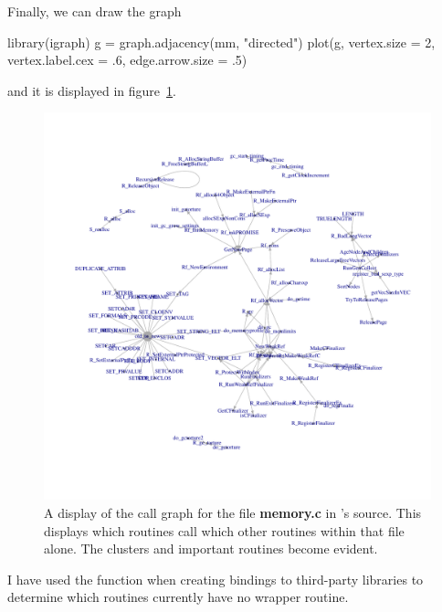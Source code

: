 \documentclass[article]{jss}
\def\R{\proglang{R}}
\def\Rpkg#1{\pkg{#1}}
\def\file#1{\textbf{#1}}
\begin{document}
Finally, we can draw the graph
\begin{RCode}
library(igraph)
g = graph.adjacency(mm, "directed")       
plot(g, vertex.size = 2, vertex.label.cex = .6, edge.arrow.size = .5)
\end{RCode}
and it is displayed in figure~\ref{fig:callgraph}.

\begin{figure}
\includegraphics[width=\textwidth,height=.9\textheight]{callgraph.pdf}
\caption{A display of the call graph for the file \file{memory.c} in
  \R's source. This displays which routines call which other routines
  within that file alone. The clusters and important routines become evident.}
  \label{fig:callgraph}
\end{figure}

I have used the \Rpkg{findCalls} function when creating bindings to
third-party libraries to determine which routines currently have no
wrapper routine.


\end{document}
